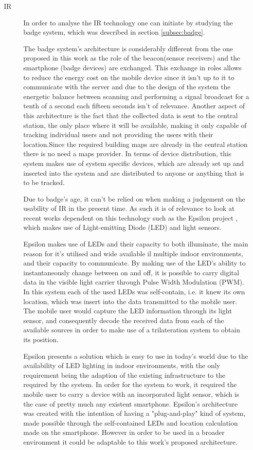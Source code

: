 \begin{description}
\item[\acf{IR}] 	In order to analyse the \ac{IR} technology one can initiate by studying the badge system, which was described in section \ref{subsec:badge}.

	The badge system's architecture is considerably different from the one proposed in this work as the role of the beacon(sensor receivers) and the smartphone (badge devices) are exchanged. This exchange in roles allows to reduce the energy cost on the mobile device since it isn't up to it to communicate with the server and due to the design of the system the energetic balance between scanning and performing a signal broadcast for a tenth of a second each fifteen seconds isn't of relevance. Another aspect of this architecture is the fact that the collected data is sent to the central station, the only place where it will be available, making it only capable of tracking individual users and not providing the users with their location.Since the required building maps are already in the central station there is no need a maps provider. In terms of device distribution, this system makes use of system specific devices, which are already set up and inserted into the system and are distributed to anyone or anything that is to be tracked.

	Due to badge's age, it can't be relied on when making a judgement on the usability of \ac{IR} in the present time. As such it is of relevance to look at recent works dependent on this technology such as the Epsilon project \cite{epsilon}, which makes use of Light-emitting Diode (LED) and light sensors.  

	Epsilon makes use of LEDs and their capacity to both illuminate, the main reason for it's utilised and wide available il multiple indoor environments, and their capacity to communicate. By making use of the LED's ability to instantaneously change between on and off, it is possible to carry digital data in the visible light carrier through Pulse Width Modulation (PWM). In this system each of the used LEDs was self-contain, i.e. it knew its own location, which was insert into the data transmitted to the mobile user. The mobile user would capture the LED information through its light sensor, and consequently decode the received data from each of the available sources in order to make use of a trilateration system to obtain its position.

	Epsilon presents a solution which is easy to use in today's world due to the availability of LED lighting in indoor environments, with the only requirement being the adaption of the existing infrastructure to the required by the system. In order for the system to work, it required the mobile user to carry a device with an incorporated light sensor, which is the case of pretty much any existent smartphone.
	Epsilon's architecture was created with the intention of having a "plug-and-play" kind of system, made possible through the self-contained LEDs and location calculation made on the smartphone. However in order to be used in a broader environment it could be adaptable to this work's proposed architecture.


\end{description}
